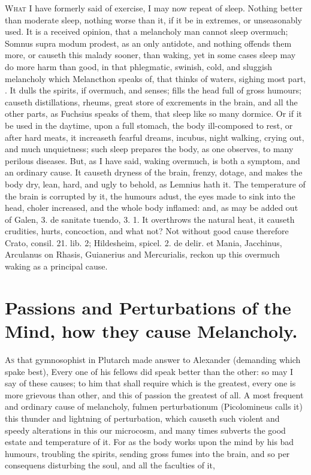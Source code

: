 {{\lettrine{W}{hat} I have formerly said of exercise, I may now repeat of sleep.
Nothing better than moderate sleep, nothing worse than it, if it be in
extremes, or unseasonably used. It is a received opinion, that a
melancholy man cannot sleep overmuch; Somnus supra modum prodest, as an
only antidote, and nothing offends them more, or causeth this malady
sooner, than waking, yet in some cases sleep may do more harm than
good, in that phlegmatic, swinish, cold, and sluggish melancholy which
Melancthon speaks of, that thinks of waters, sighing most part, \etc{}.
It dulls the spirits, if overmuch, and senses; fills the head
full of gross humours; causeth distillations, rheums, great store of
excrements in the brain, and all the other parts, as Fuchsius
speaks of them, that sleep like so many dormice. Or if it be used in
the daytime, upon a full stomach, the body ill-composed to rest, or
after hard meats, it increaseth fearful dreams, incubus, night walking,
crying out, and much unquietness; such sleep prepares the body, as
one observes, to many perilous diseases. But, as I have said,
waking overmuch, is both a symptom, and an ordinary cause. It causeth
dryness of the brain, frenzy, dotage, and makes the body dry, lean,
hard, and ugly to behold, as Lemnius hath it. The temperature of
the brain is corrupted by it, the humours adust, the eyes made to sink
into the head, choler increased, and the whole body inflamed: and, as
may be added out of Galen, 3. de sanitate tuendo, \Avicenna{} 3. 1.
It overthrows the natural heat, it causeth crudities, hurts,
concoction, and what not? Not without good cause therefore Crato,
consil. 21. lib. 2; Hildesheim, spicel. 2. de delir. et Mania,
Jacchinus, Arculanus on Rhasis, Guianerius and Mercurialis, reckon up
this overmuch waking as a principal cause.


\section{Passions and Perturbations of the Mind, how they cause Melancholy.}

\lettrine{A}{s} that gymnosophist in Plutarch made answer to Alexander
(demanding which spake best), Every one of his fellows did speak better
than the other: so may I say of these causes; to him that shall require
which is the greatest, every one is more grievous than other, and this
of passion the greatest of all. A most frequent and ordinary cause of
melancholy,  fulmen perturbationum (Picolomineus calls it) this
thunder and lightning of perturbation, which causeth such violent and
speedy alterations in this our microcosm, and many times subverts the
good estate and temperature of it. For as the body works upon the mind
by his bad humours, troubling the spirits, sending gross fumes into the
brain, and so per consequens disturbing the soul, and all the faculties
of it,

}}

